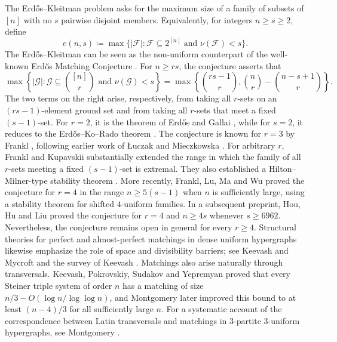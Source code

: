 \documentclass[10pt,a4paper]{article}
\numberwithin{equation}{section}
\theoremstyle{definition}
\newcommand{\F}{\mathcal F}
\begin{document}
The Erd\H{o}s--Kleitman problem asks for the maximum size of a family of subsets of $[n]$ with no $s$ pairwise disjoint members.
Equivalently, for integers $n\ge s\ge2$, define
\[
        e(n,s)\coloneqq
        \max\{ |\F|:\F\subseteq2^{[n]}\text{ and }\nu(\F)<s\}.
\]
The Erd\H{o}s--Kleitman can be seen as the non-uniform counterpart of the well-known Erd\H{o}s Matching Conjecture \cite{ErdosEMC}.
For $n\ge rs$, the conjecture asserts that
\[
        \max\left\{|\mathcal G|:\mathcal G\subseteq\binom{[n]}r
        \text{ and }\nu(\mathcal G)<s\right\}
        =
        \max\left\{
        \binom{rs-1}r,
        \binom nr-\binom{n-s+1}r
        \right\}.
\]
The two terms on the right arise, respectively, from taking all $r$-sets on an $(rs-1)$-element ground set and from taking all $r$-sets that meet a fixed $(s-1)$-set.
For $r=2$, it is the theorem of Erd\H{o}s and Gallai \cite{ErdosGallai}, while for $s=2$, it reduces to the Erd\H{o}s--Ko--Rado theorem \cite{ErdosKoRado}.
The conjecture is known for $r=3$ by Frankl \cite{FranklDAM}, following earlier work of \L{}uczak and Mieczkowska \cite{LuczakMieczkowska}.
For arbitrary $r$, Frankl and Kupavskii \cite{FranklKupavskiiConcentration} substantially extended the range in which the family of all $r$-sets meeting a fixed $(s-1)$-set is extremal. They also established a Hilton--Milner-type stability theorem \cite{FranklKupavskiiTwoProblems}.
More recently, Frankl, Lu, Ma and Wu \cite{FranklLuMaWu} proved the conjecture for $r=4$ in the range $n\ge5(s-1)$ when $n$ is sufficiently large, using a stability theorem for shifted $4$-uniform families.
In a subsequent preprint, Hou, Hu and Liu \cite{HouHuLiuEMC} proved the conjecture for $r=4$ and $n\ge4s$ whenever $s\ge6962$.
Nevertheless, the conjecture remains open in general for every $r\ge 4$.
Structural theories for perfect and almost-perfect matchings in dense uniform hypergraphs likewise emphasize the role of space and divisibility barriers; see Keevash and Mycroft \cite{KeevashMycroft} and the survey of Keevash \cite{KeevashSurvey}.
Matchings also arise naturally through transversals.
Keevash, Pokrovskiy, Sudakov and Yepremyan \cite{KeevashPokrovskiySudakovYepremyan} proved that every Steiner triple system of order $n$ has a matching of size $n/3-O(\log n/\log\log n)$, and Montgomery \cite{MontgomeryRBS} later improved this bound to at least $(n-4)/3$ for all sufficiently large $n$.
For a systematic account of the correspondence between Latin transversals and matchings in $3$-partite $3$-uniform hypergraphs, see Montgomery \cite{MontgomerySurvey}.
\end{document}

